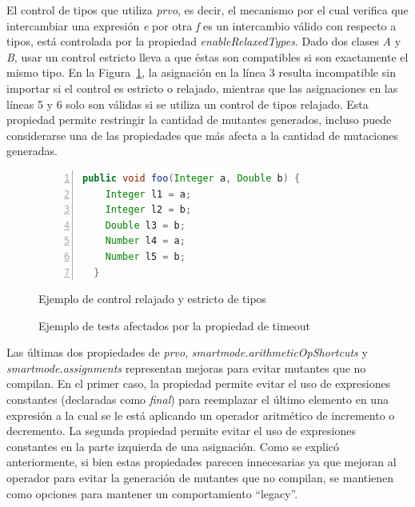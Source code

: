 El control de tipos que utiliza \emph{prvo}, es decir, el mecanismo por el cual verifica que intercambiar una expresi\'on \emph{e} por otra \emph{f} es un intercambio v\'alido con respecto a tipos, est\'a controlada por la propiedad \emph{enableRelaxedTypes}. Dado dos clases \emph{A} y \emph{B}, usar un control estricto lleva a que \'estas son compatibles si son exactamente el mismo tipo. En la Figura~\ref{figures.examples.operators.prvo.relaxedVsStrict}, la asignaci\'on en la l\'inea 3 resulta incompatible sin importar si el control es estricto o relajado, mientras que las asignaciones en las l\'ineas 5 y 6 solo son v\'alidas si se utiliza un control de tipos relajado. Esta propiedad permite restringir la cantidad de mutantes generados, incluso puede considerarse una de las propiedades que m\'as afecta a la cantidad de mutaciones generadas.

\begin{figure}
	\begin{lstlisting}[frame=single, numbers=left, mathescape=true,language=Java,basicstyle={},framexleftmargin=.073\textwidth,xleftmargin=.085\textwidth,xrightmargin=0.012\textwidth]
  public void foo(Integer a, Double b) {
    Integer l1 = a;
    Integer l2 = b;
    Double l3 = b;
    Number l4 = a;
    Number l5 = b;
  }
	\end{lstlisting}
	\caption{Ejemplo de control relajado y estricto de tipos}
	\label{figures.examples.operators.prvo.relaxedVsStrict}
\end{figure}

\begin{figure}
	
	\caption{Ejemplo de tests afectados por la propiedad de timeout}
	\label{figures.examples.confFile.testTimeout}
\end{figure}

Las \'ultimas dos propiedades de \emph{prvo}, \emph{smartmode.arithmeticOpShortcuts} y \emph{smartmode.assignments} representan mejoras para evitar mutantes que no compilan. En el primer caso, la propiedad permite evitar el uso de expresiones constantes (declaradas como \emph{final}) para reemplazar el \'ultimo elemento en una expresi\'on a la cual se le est\'a aplicando un operador aritm\'etico de incremento o decremento. La segunda propiedad permite evitar el uso de expresiones constantes en la parte izquierda de una asignaci\'on. Como se explic\'o anteriormente, si bien estas propiedades parecen innecesarias ya que mejoran al operador para evitar la generaci\'on de mutantes que no compilan, se mantienen como opciones para mantener un comportamiento ``legacy''.

